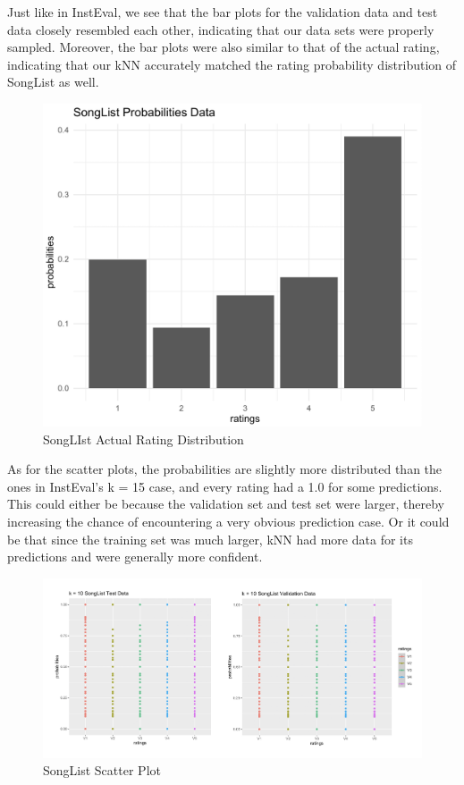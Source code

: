 \documentclass{article}
\begin{document}
Just like in InstEval, we see that the bar plots for the validation data and test data closely resembled each other, indicating that our data sets were properly sampled. Moreover, the bar plots were also similar to that of the actual rating, indicating that our kNN accurately matched the rating probability distribution of SongList as well.

\begin{figure}[ht]
\centering
\includegraphics[scale=0.2]{SongList Actual Probs.png}
\caption{SongLIst Actual Rating Distribution}
\end{figure}

As for the scatter plots, the probabilities are slightly more distributed than the ones in InstEval's k = 15 case, and every rating had a 1.0 for some predictions. This could either be because the validation set and test set were larger, thereby increasing the chance of encountering a very obvious prediction case. Or it could be that since the training set was much larger, kNN had more data for its predictions and were generally more confident. 

\begin{figure}[ht]
\centering
\includegraphics[scale=0.3]{k = 10 SL Scatter Plot.png}
\caption{SongList Scatter Plot}
\end{figure}
\end{document}

